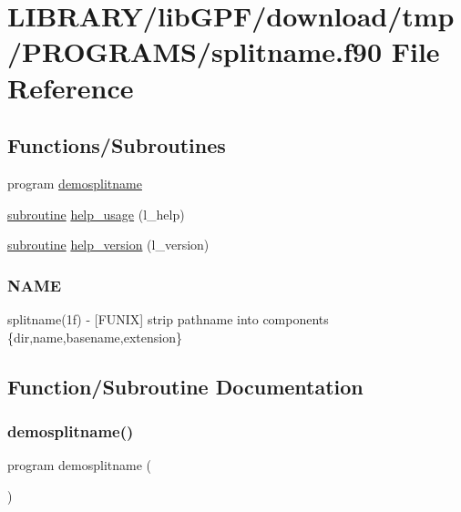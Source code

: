 \hypertarget{splitname_8f90}{}\section{L\+I\+B\+R\+A\+R\+Y/lib\+G\+P\+F/download/tmp/\+P\+R\+O\+G\+R\+A\+M\+S/splitname.f90 File Reference}
\label{splitname_8f90}
\subsection*{Functions/\+Subroutines}
\begin{DoxyCompactItemize}
\item 
program \hyperlink{splitname_8f90_a58447edeccd89127101d970f9b98a35c}{demosplitname}
\item 
\hyperlink{M__stopwatch_83_8txt_acfbcff50169d691ff02d4a123ed70482}{subroutine} \hyperlink{splitname_8f90_ae98d08b210b063a2558aa2abdb67fa8e}{help\+\_\+usage} (l\+\_\+help)
\item 
\hyperlink{M__stopwatch_83_8txt_acfbcff50169d691ff02d4a123ed70482}{subroutine} \hyperlink{splitname_8f90_a2518cc098132c46ba9d8fd8c74d8fc0d}{help\+\_\+version} (l\+\_\+version)
\begin{DoxyCompactList}\small\item\em \subsubsection*{N\+A\+ME}

splitname(1f) -\/ \mbox{[}F\+U\+N\+IX\mbox{]} strip pathname into components \{dir,name,basename,extension\} \end{DoxyCompactList}\end{DoxyCompactItemize}


\subsection{Function/\+Subroutine Documentation}
\mbox{\label{splitname_8f90_a58447edeccd89127101d970f9b98a35c}} 
\subsubsection{\texorpdfstring{demosplitname()}{demosplitname()}}
{\footnotesize\ttfamily program demosplitname (\begin{DoxyParamCaption}{ }\end{DoxyParamCaption})}



